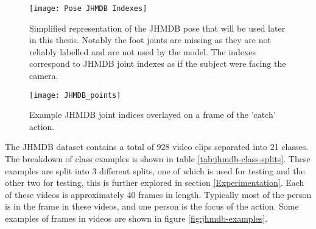 \begin{figure}[ht]
	\texttt{[image: Pose JHMDB Indexes]}
	\centering
	\caption{Simplified representation of the JHMDB pose that will be used later in this thesis. Notably the foot joints are missing as they are not reliably labelled and are not used by the model. The indexes correspond to JHMDB joint indexes as if the subject were facing the camera.}
	\label{fig:JHMDB}
\end{figure}

\begin{figure}[ht]
	\texttt{[image: JHMDB\_points]}
	\centering
	\caption{Example JHMDB \cite{JHMDB} joint indices overlayed on a frame of the 'catch' action.}
	\label{fig:JHMDB-example-pose}
\end{figure}

The JHMDB dataset contains a total of 928 video clips separated into 21 classes. The breakdown of class examples is shown in table \ref{tab:jhmdb-class-splits}. These examples are split into 3 different splits, one of which is used for testing and the other two for testing, this is further explored in section \ref{Experimentation}. Each of these videos is approximately 40 frames in length. Typically most of the person is in the frame in these videos, and one person is the focus of the action. Some examples of frames in videos are shown in figure \ref{fig:jhmdb-examples}.

